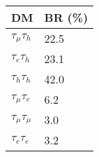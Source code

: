 \documentclass{article}
\begin{document}
\begin{table}[]
  \begin{tabular}{>{\raggedleft\arraybackslash}p{0.6cm}|p{1.2cm}}
    DM             &  BR (\%) \\ \cline{1-2}
    $\tau_{\mu}\tau_{h}$   & 22.5  \\
    $\tau_{e}\tau_{h}$     & 23.1  \\
    $\tau_{h}\tau_{h}$     & 42.0  \\
    $\tau_{\mu}\tau_{e}$   & 6.2   \\
    $\tau_{\mu}\tau_{\mu}$ & 3.0   \\
    $\tau_{e}\tau_{e}$     & 3.2   \\
  \end{tabular}
\end{table}
\end{document}
